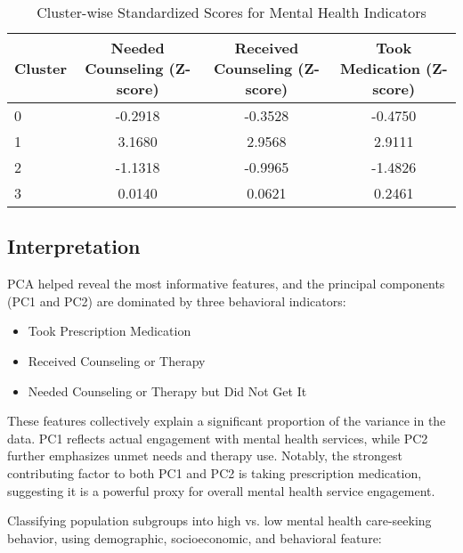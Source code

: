 \documentclass{article}
\begin{document}
\begin{table}[h!]
\centering
\begin{adjustbox}{max width=\textwidth}

\begin{tabular}{lccc}
\toprule
\textbf{Cluster} & \textbf{Needed Counseling (Z-score)} & \textbf{Received Counseling (Z-score)} & \textbf{Took Medication (Z-score)} \\
\midrule
0 & -0.2918 & -0.3528 & -0.4750 \\
1 &  3.1680 &  2.9568 &  2.9111 \\
2 & -1.1318 & -0.9965 & -1.4826 \\
3 &  0.0140 &  0.0621 &  0.2461 \\
\bottomrule
\end{tabular}

\end{adjustbox}
\caption{Cluster-wise Standardized Scores for Mental Health Indicators}
\end{table}

\subsection{Interpretation}

PCA helped reveal the most informative features, and the principal components (PC1 and PC2) are dominated by three behavioral indicators:
\begin{itemize}
    \item Took Prescription Medication
    \item Received Counseling or Therapy
    \item Needed Counseling or Therapy but Did Not Get It
\end{itemize}

These features collectively explain a significant proportion of the variance in the data. PC1 reflects actual engagement with mental health services, while PC2 further emphasizes unmet needs and therapy use. Notably, the strongest contributing factor to both PC1 and PC2 is taking prescription medication, suggesting it is a powerful proxy for overall mental health service engagement.

\vspace{0.5cm}

Classifying population subgroups into high vs. low mental health care-seeking behavior, using demographic, socioeconomic, and behavioral feature:

\vspace{0.2cm}
\end{document}
